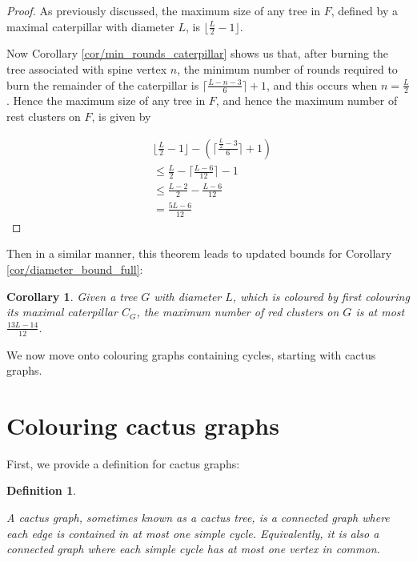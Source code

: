 \documentclass{mpaper}
\newtheorem{definition}[theorem]{Definition}
\newtheorem{corollary}[theorem]{Corollary}
\begin{document}
\begin{proof}
  As previously discussed, the maximum size of any tree in $F$, defined by a maximal caterpillar with diameter $L$, is $\lfloor \frac{L}{2} - 1 \rfloor$.
  
  Now Corollary \ref{cor/min_rounds_caterpillar} shows us that, after burning the tree associated with spine vertex $n$, the minimum number of rounds required to burn the remainder of the caterpillar is $\lceil \frac{L-n-3}{6} \rceil + 1$, and this occurs when $n=\frac{L}{2}$. Hence the maximum size of any tree in $F$, and hence the maximum number of rest clusters on $F$, is given by
  
  \begin{align*}
      &\lfloor \frac{L}{2} - 1 \rfloor - \left(\lceil \frac{\frac{L}{2}-3}{6} \rceil + 1\right) \\
      &\leq \frac{L}{2}  - \lceil \frac{L-6}{12} \rceil - 1 \\
      &\leq \frac{L-2}{2} - \frac{L-6}{12} \\
      &= \frac{5L-6}{12}
  \end{align*}
\end{proof}

  Then in a similar manner, this theorem leads to updated bounds for Corollary \ref{cor/diameter_bound_full}:

\begin{corollary}
\label{cor/diameter_bound_full_2}
Given a tree $G$ with diameter $L$, which is coloured by first colouring its maximal caterpillar $C_G$, the maximum number of red clusters on $G$ is at most $\frac{13L-14}{12}$.

\end{corollary}

We now move onto colouring graphs containing cycles, starting with cactus graphs.

\section{Colouring cactus graphs}
\label{sec/cactus_colouring}
\vspace{1em}

First, we provide a definition for cactus graphs:

\begin{definition}
  \label{def/cactus_graphs}

  A \emph{cactus graph}, sometimes known as a cactus tree, is a connected graph where each edge is contained in at most one simple cycle. Equivalently, it is also a connected graph where each simple cycle has at most one vertex in common. 
\end{definition}
\end{document}
